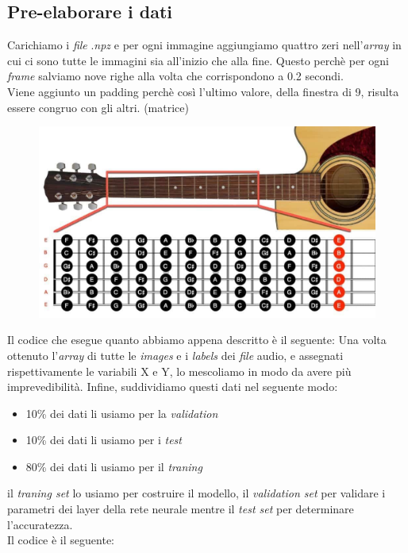 \subsection{Pre-elaborare i dati}
Carichiamo i \textit{file} .\textit{npz} e per ogni immagine aggiungiamo quattro zeri nell'\textit{array} in cui ci sono tutte le immagini sia all'inizio che alla fine. Questo perchè per ogni \textit{frame} salviamo nove righe alla volta che corrispondono a 0.2 secondi.\\
\newline
Viene aggiunto un padding perchè così l'ultimo valore, della finestra di 9, risulta essere congruo con gli altri. (matrice)
\begin{figure}[H]
	\centering
	\includegraphics[scale=0.30]{./images/img12.jpg}
\end{figure}
Il codice che esegue quanto abbiamo appena descritto è il seguente:
\vspace*{2ex}
\vspace*{2ex}
Una volta ottenuto l'\textit{array} di tutte le \textit{images} e i \textit{labels} dei \textit{file} audio, e assegnati rispettivamente le variabili X e Y, lo mescoliamo in modo da avere più imprevedibilità. Infine, suddividiamo questi dati nel seguente modo:
\begin{itemize}
	\item 10\% dei dati li usiamo per la \textit{validation}
	\item 10\% dei dati li usiamo per i \textit{test}
	\item 80\% dei dati li usiamo per il \textit{traning}
\end{itemize}
il \textit{traning set} lo usiamo per costruire il modello, il \textit{validation set} per validare i parametri dei layer della rete neurale mentre il \textit{test set} per determinare l'accuratezza.\\
\newline
Il codice è il seguente:
\vspace*{2ex}
\vspace*{2ex}
